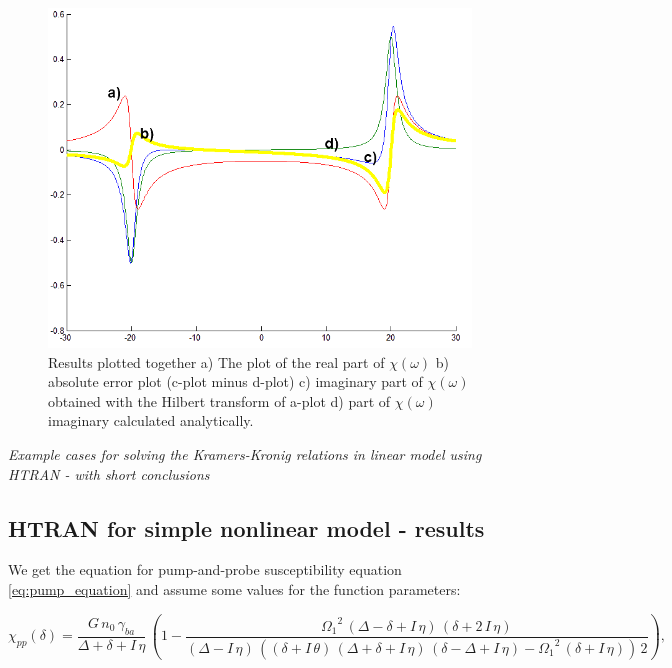 \documentclass[12pt,twoside,a4paper]{article}
\numberwithin{equation}{subsection}
\numberwithin{figure}{subsection}
\begin{document}
\begin{figure} 
  \includegraphics[width=150mm]{img/htran_lin.png}
  \caption{Results plotted together 
   a) The plot of the real part of $\chi (\omega )$ 
   b) absolute error plot (c-plot minus d-plot) 
   c) imaginary part of $\chi (\omega )$ obtained with the Hilbert transform of a-plot 
   d) part of $\chi (\omega )$ imaginary calculated analytically. \label{eq:htran_lin}
  }
\end{figure}

\footnotesize{\textit{Example cases for solving the Kramers-Kronig relations in linear model using HTRAN - with short conclusions}}

\subsection{HTRAN for simple nonlinear model - results} \label{chap:htran_nlo}

We get the equation for pump-and-probe susceptibility equation \ref{eq:pump_equation} and assume some values for the function
parameters:

\begin{equation} \label{eq:htran_fparameters}
  {\chi_{pp}}(\delta )=\frac {G\,{n_{0}}\,{\gamma_{ba}}}{\Delta  + \delta  + I\,\eta } \, \left( \! 1 - \frac
  {{\Omega_{1}}^{2}\,(\Delta - \delta  + I\,\eta )\,(\delta  + 2\,I\,\eta )}{(\Delta  - I\,\eta )\,((\delta + I\,\theta )\,(\Delta 
  + \delta  + I\,\eta )\,(\delta - \Delta  + I\,\eta ) - {\Omega_{1}}^{2}\,(\delta  + I\,\eta ))\,2} \! \right) ,
\end{equation}
\end{document}

